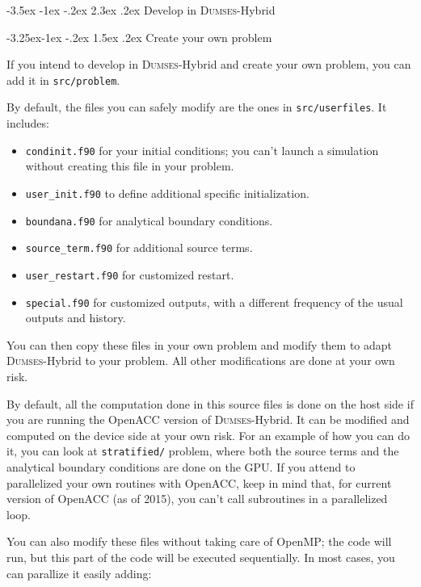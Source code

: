 \documentclass[a4paper,12pt]{article}
\makeatletter
\renewcommand{\section}{\clearpage\@startsection {section}{1}{\z@}%
             {-3.5ex \@plus -1ex \@minus -.2ex}%
             {2.3ex \@plus .2ex}%
             {\normalfont\Large\sffamily\bfseries}}
\renewcommand{\subsection}{\@startsection{subsection}{2}{\z@}%
             {-3.25ex\@plus -1ex \@minus -.2ex}%
             {1.5ex \@plus .2ex}%
             {\normalfont\large\sffamily\bfseries}}
\makeatother
\begin{document}
\section{Develop in \textsc{Dumses}-Hybrid}

\subsection{Create your own problem}

If you intend to develop in \textsc{Dumses}-Hybrid and create your own problem, you can add it in \texttt{src/problem}.

By default, the files you can safely modify are the ones in \texttt{src/userfiles}. It includes:
\begin{itemize}
  \item \texttt{condinit.f90} for your initial conditions; you can't launch a simulation without creating this file in your problem.
  \item \texttt{user\_init.f90} to define additional specific initialization.
  \item \texttt{boundana.f90} for analytical boundary conditions.
  \item \texttt{source\_term.f90} for additional source terms.
  \item \texttt{user\_restart.f90} for customized restart.
  \item \texttt{special.f90} for customized outputs, with a different frequency of the usual outputs and history.
\end{itemize}

You can then copy these files in your own problem and modify them to adapt \textsc{Dumses}-Hybrid to your problem. All other modifications are done at your own risk.

By default, all the computation done in this source files is done on the host side if you are running the OpenACC version of \textsc{Dumses}-Hybrid. It can be modified and computed on the device side at your own risk. For an example of how you can do it, you can look at \texttt{stratified/} problem, where both the source terms and the analytical boundary conditions are done on the GPU. If you attend to parallelized your own routines with OpenACC, keep in mind that, for current version of OpenACC (as of 2015), you can't call subroutines in a parallelized loop.

You can also modify these files without taking care of OpenMP; the code will run, but this part of the code will be executed sequentially. In most cases, you can parallize it easily adding:
\end{document}
